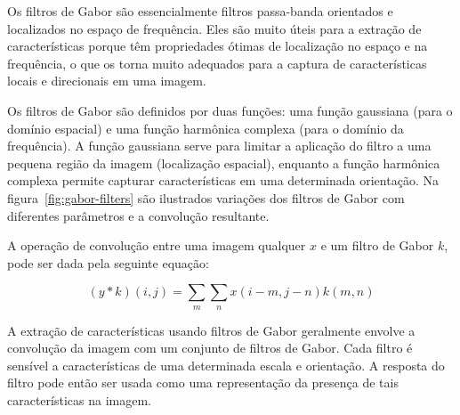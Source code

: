 Os filtros de Gabor são essencialmente filtros passa-banda orientados
e localizados no espaço de frequência. Eles são muito úteis para a
extração de características porque têm propriedades ótimas de
localização no espaço e na frequência, o que os torna muito adequados
para a captura de características locais e direcionais em uma imagem.

Os filtros de Gabor são definidos por duas funções: uma função
gaussiana (para o domínio espacial) e uma função harmônica complexa
(para o domínio da frequência). A função gaussiana serve para limitar
a aplicação do filtro a uma pequena região da imagem (localização
espacial), enquanto a função harmônica complexa permite capturar
características em uma determinada orientação. Na
figura~\ref{fig:gabor-filters} são ilustrados variações dos
filtros de Gabor com diferentes parâmetros e a convolução resultante.

\begin{figure}[!h]
        \captionsetup{width=12cm}
		\centering
\end{figure}
\FloatBarrier{}

A operação de convolução entre uma imagem qualquer $ x $ e um filtro de
Gabor $ k $, pode ser dada pela seguinte equação:

\begin{equation}
  (y * k)(i, j) = \sum_{m} \sum_{n} x(i-m, j-n) k(m, n)
\end{equation}

A extração de características usando filtros de Gabor geralmente
envolve a convolução da imagem com um conjunto de filtros de
Gabor. Cada filtro é sensível a características de uma determinada
escala e orientação. A resposta do filtro pode então ser usada como
uma representação da presença de tais características na imagem.

